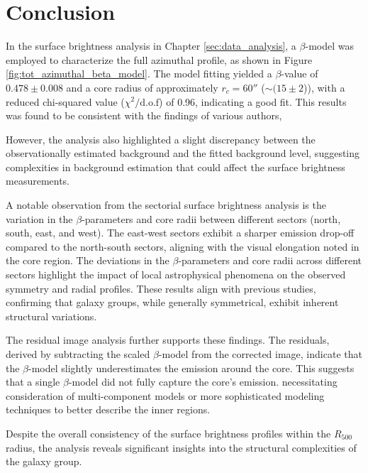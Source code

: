 
\chapter{Conclusion}
\label{sec:conclusion}

In the surface brightness analysis in Chapter \ref{sec:data_analysis}, a \(\beta\)-model was employed to characterize the full azimuthal profile, as shown in Figure \ref{fig:tot_azimuthal_beta_model}. The model fitting yielded a \(\beta\)-value of \(0.478 \pm 0.008\) and a core radius of approximately \(r_c = 60''\) (\(\sim (15\pm2\))), with a reduced chi-squared value (\(\chi^2 / \text{d.o.f}\)) of 0.96, indicating a good fit. This results was found to be consistent with the findings of various authors,   


However, the analysis also highlighted a slight discrepancy between the observationally estimated background and the fitted background level, suggesting complexities in background estimation that could affect the surface brightness measurements.

A notable observation from the sectorial surface brightness analysis is the variation in the \(\beta\)-parameters and core radii between different sectors (north, south, east, and west). The east-west sectors exhibit a sharper emission drop-off compared to the north-south sectors, aligning with the visual elongation noted in the core region. The deviations in the \(\beta\)-parameters and core radii across different sectors highlight the impact of local astrophysical phenomena on the observed symmetry and radial profiles. These results align with previous studies, confirming that galaxy groups, while generally symmetrical, exhibit inherent structural variations.

The residual image analysis further supports these findings. The residuals, derived by subtracting the scaled \(\beta\)-model from the corrected image, indicate that the \(\beta\)-model slightly underestimates the emission around the core. This suggests that a single \(\beta\)-model did not fully capture the core's emission. necessitating consideration of multi-component models or more sophisticated modeling techniques to better describe the inner regions.

Despite the overall consistency of the surface brightness profiles within the \(R_{500}\) radius, the analysis reveals significant insights into the structural complexities of the galaxy group. 

